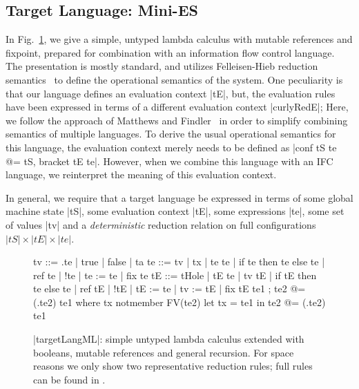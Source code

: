\subsection{Target Language: Mini-ES}

In Fig.~\ref{fig:ml}, we give a simple, untyped lambda calculus with
mutable references and fixpoint, prepared for combination with an
information flow control language.  The presentation is mostly standard, and utilizes Felleisen-Hieb reduction
semantics~\cite{Felleisen:1992:RRS:136293.136297} to define the
operational semantics of the system.  One peculiarity is that our language
defines an evaluation context |tE|, but, the evaluation rules have been
expressed in terms of a different evaluation context |curlyRedE|;
Here, we follow the approach of Matthews and
Findler~\cite{Matthews:2007:OSM:1190216.1190220} in order to simplify combining
semantics of multiple languages.
To derive the usual operational semantics for this language, the evaluation
context merely needs to be defined as |conf tS te @= tS, bracket tE te|.
However, when we combine this language with an IFC language, we
reinterpret the meaning of this evaluation context.

In general, we require that a target language be expressed in terms
of some global machine state |tS|, some evaluation context |tE|,
some expressions |te|, some set of values |tv| and a \emph{deterministic}
reduction relation on full configurations $|tS| \times |tE| \times |te|$.

\begin{figure}[t]
\begin{code}
tv   ::= \tx.te | true | false | ta
te   ::= tv | tx | te te | if te then te else te | ref te | !te | te := te | fix te
tE   ::= tHole | tE te | tv tE | if tE then te else te | ref tE | !tE | tE := te | tv := tE | fix tE
te1 ; te2            @= (\tx.te2) te1  where  tx notmember FV(te2)
let tx = te1 in te2  @= (\tx.te2) te1
\end{code}

\caption{|targetLangML|: simple untyped lambda calculus extended with booleans,
mutable references and general recursion.  For space reasons we only show two
representative reduction rules;  full rules can be found in .}
\label{fig:ml}
\end{figure}

